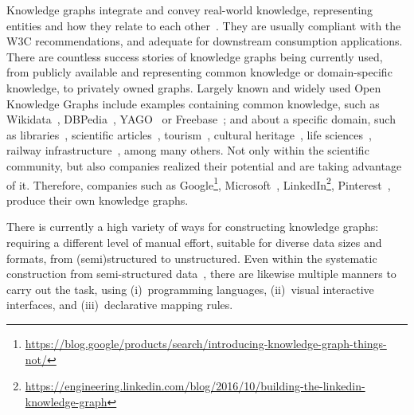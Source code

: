 Knowledge graphs integrate and convey real-world knowledge, representing entities and how they relate to each other~\parencite{hogan2021kg}.
They are usually compliant with the W3C recommendations, and adequate for downstream consumption applications.
There are countless success stories of knowledge graphs being currently used, from publicly available and representing common knowledge or domain-specific knowledge, to privately owned graphs. 
Largely known and widely used Open Knowledge Graphs include examples containing common knowledge, such as Wikidata~\parencite{erxleben2014introducing}, DBPedia~\parencite{lehmann2015dbpedia}, YAGO~\parencite{pellissier2020yago} or Freebase~\parencite{bollacker2007freebase}; 
and about a specific domain, such as 
libraries~\parencite{vila2013datos}, 
scientific articles~\parencite{stocker2023orkg,farber2023semopenalex}, 
tourism~\parencite{karle2018building}, 
cultural heritage~\parencite{carriero2019arco}, 
life sciences~\parencite{dumontier2014bio2rdf,pinero2020disgenet},
railway infrastructure~\parencite{rojas2021leveraging}, among many others. 
Not only within the scientific community, but also companies realized their potential and are taking advantage of it. Therefore, companies such as
Google\footnote{\url{https://blog.google/products/search/introducing-knowledge-graph-things-not/}},
Microsoft~\parencite{farber2019microsoft},
LinkedIn\footnote{\url{https://engineering.linkedin.com/blog/2016/10/building-the-linkedin-knowledge-graph}}, 
Pinterest~\parencite{goncalves2019pinterest},
produce their own knowledge graphs. 


There is currently a high variety of ways for constructing knowledge graphs: requiring a different level of manual effort, suitable for diverse data sizes and formats, from (semi)structured to unstructured. %
Even within the systematic construction from semi-structured data~\parencite{Poggi2008}, there are likewise multiple manners to carry out the task, using (i)~programming languages, (ii)~visual interactive interfaces, and (iii)~declarative mapping rules. 

